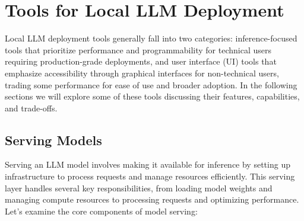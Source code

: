\section{Tools for Local LLM Deployment}

Local LLM deployment tools generally fall into two categories: inference-focused tools that prioritize performance and programmability for technical users requiring production-grade deployments, and user interface (UI) tools that emphasize accessibility through graphical interfaces for non-technical users, trading some performance for ease of use and broader adoption. In the following sections we will explore some of these tools discussing their features, capabilities, and trade-offs.

\subsection{Serving Models}

Serving an LLM model involves making it available for inference by setting up infrastructure to process requests and manage resources efficiently. This serving layer handles several key responsibilities, from loading model weights and managing compute resources to processing requests and optimizing performance. Let's examine the core components of model serving:

